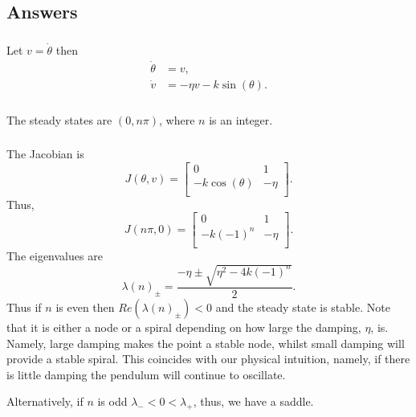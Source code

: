 \documentclass[]{article}
\newcommand{\bb}{\begin{equation}}
\newcommand{\ee}{\end{equation}}
\begin{document}
\begin{Answ}
\subsection{Answers}
\subsubsection{}
Let $v=\dot{\theta}$ then
\begin{align}
\dot{\theta}&=v,\\
\dot{v}&=-\eta v-k\sin(\theta).
\end{align}

\subsubsection{}
The steady states are $(0,n\pi)$, where $n$ is an integer.
\subsubsection{}
The Jacobian is
\bb
J(\theta,v)=\left[ {\begin{array}{cc}
   0&1 \\
  -k\cos(\theta) & -\eta \\
  \end{array} } \right].
\ee
Thus,
\bb
J(n\pi,0)=\left[ {\begin{array}{cc}
   0&1 \\
  -k(-1)^n & -\eta \\
  \end{array} } \right].
\ee
The eigenvalues are
\bb
\lambda(n)_\pm=\frac{-\eta\pm\sqrt{\eta^2-4k(-1)^n}}{2}.
\ee
Thus if $n$ is even then $Re(\lambda(n)_\pm)<0$ and the steady state is stable. Note that it is either a node or a spiral depending on how large the damping, $\eta$, is. Namely, large damping makes the point a stable node, whilst small damping will provide a stable spiral. This coincides with our physical intuition, namely, if there is little damping the pendulum will continue to oscillate.

Alternatively, if $n$ is odd $\lambda_-<0<\lambda_+$, thus, we have a saddle.

\end{Answ}
\end{document}
